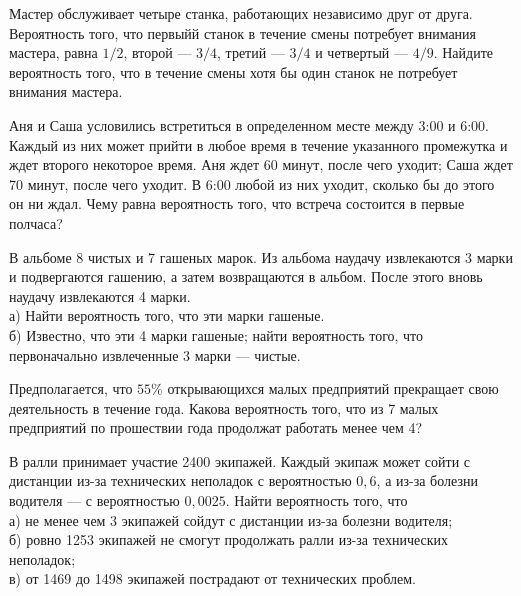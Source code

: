 \newpage\setcounter{zad}{0}



\begin{zkrW}{20}\noindent 
	Мастер обслуживает четыре станка, работающих независимо друг от друга. Вероятность того, что первыйй станок в течение смены потребует внимания мастера, равна $1/2$, второй --- $3/4$, третий --- $3/4$ и четвертый --- $4/9$. Найдите вероятность того, что в течение смены хотя бы один станок не потребует внимания мастера.
 
\end{zkrW}

\begin{zkrW}{20}\noindent 
	Аня и Саша условились встретиться в определенном месте между 3:00 и 6:00. Каждый из них может прийти в любое время в течение указанного промежутка и ждет второго некоторое время. Аня ждет 60 минут, после чего уходит; Саша ждет 70 минут, после чего уходит. В 6:00 любой из них уходит, сколько бы до этого он ни ждал. Чему равна вероятность того, что встреча состоится в первые полчаса?
 
\end{zkrW}

\begin{zkrW}{20}\noindent 
	В альбоме 8 чистых и 7 гашеных марок. Из альбома наудачу извлекаются 3 марки и подвергаются гашению, а затем возвращаются в альбом. После этого вновь наудачу извлекаются 4 марки. \\ \indent а) Найти вероятность того, что эти марки гашеные. \\ \indent б) Известно, что эти 4 марки гашеные; найти вероятность того, что первоначально извлеченные 3 марки --- чистые.
 
\end{zkrW}

\begin{zkrW}{20}\noindent 
	Предполагается, что $55\%$ открывающихся малых предприятий прекращает свою деятельность в течение года. Какова вероятность того, что из 7 малых предприятий по прошествии года продолжат работать менее чем 4?
 
\end{zkrW}

\begin{zkrW}{20}\noindent 
	В ралли принимает участие 2400 экипажей. Каждый экипаж может сойти с дистанции из-за технических неполадок с вероятностью $0{,}6$, а из-за болезни водителя --- с вероятностью $0{,}0025$. Найти вероятность того, что \\ \indent а) не менее чем 3 экипажей сойдут с дистанции из-за болезни водителя; \\ \indent б) ровно 1253 экипажей не смогут продолжать ралли из-за технических неполадок; \\ \indent в) от 1469 до 1498 экипажей пострадают от технических проблем.
 
\end{zkrW}

